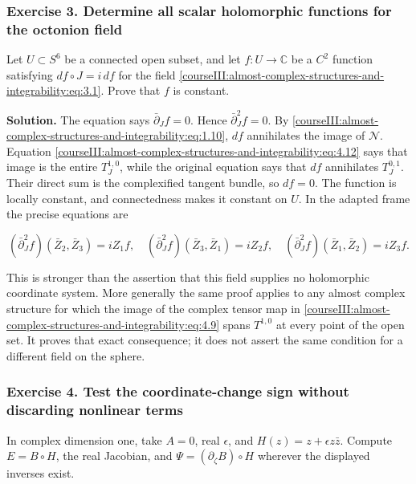 \subsubsection{Exercise 3. Determine all scalar holomorphic functions for the octonion field}
\label{courseIII:almost-complex-structures-and-integrability:exercise-3}

Let \(U\subset S^6\) be a connected open subset, and let \(f:U\to\mathbb C\) be a \(C^2\) function satisfying \(df\circ J=i\,df\) for the field \eqref{courseIII:almost-complex-structures-and-integrability:eq:3.1}. Prove that \(f\) is constant.

\textbf{Solution.} The equation says \(\bar\partial_Jf=0\). Hence \(\bar\partial_J^2f=0\). By \eqref{courseIII:almost-complex-structures-and-integrability:eq:1.10}, \(df\) annihilates the image of \(\mathscr N\). Equation \eqref{courseIII:almost-complex-structures-and-integrability:eq:4.12} says that image is the entire \(T^{1,0}_J\), while the original equation says that \(df\) annihilates \(T^{0,1}_J\). Their direct sum is the complexified tangent bundle, so \(df=0\). The function is locally constant, and connectedness makes it constant on \(U\). In the adapted frame the precise equations are

\begin{equation}
(\bar\partial_J^2f)(\bar Z_2,\bar Z_3)=iZ_1f,
\quad
(\bar\partial_J^2f)(\bar Z_3,\bar Z_1)=iZ_2f,
\quad
(\bar\partial_J^2f)(\bar Z_1,\bar Z_2)=iZ_3f.
\label{courseIII:almost-complex-structures-and-integrability:eq:11.2}
\end{equation}

This is stronger than the assertion that this field supplies no holomorphic coordinate system. More generally the same proof applies to any almost complex structure for which the image of the complex tensor map in \eqref{courseIII:almost-complex-structures-and-integrability:eq:4.9} spans \(T^{1,0}\) at every point of the open set. It proves that exact consequence; it does not assert the same condition for a different field on the sphere.

\subsubsection{Exercise 4. Test the coordinate-change sign without discarding nonlinear terms}
\label{courseIII:almost-complex-structures-and-integrability:exercise-4}

In complex dimension one, take \(A=0\), real \(\epsilon\), and \(H(z)=z+\epsilon z\bar z\). Compute \(E=B\circ H\), the real Jacobian, and \(\Psi=(\partial_\zeta B)\circ H\) wherever the displayed inverses exist.

